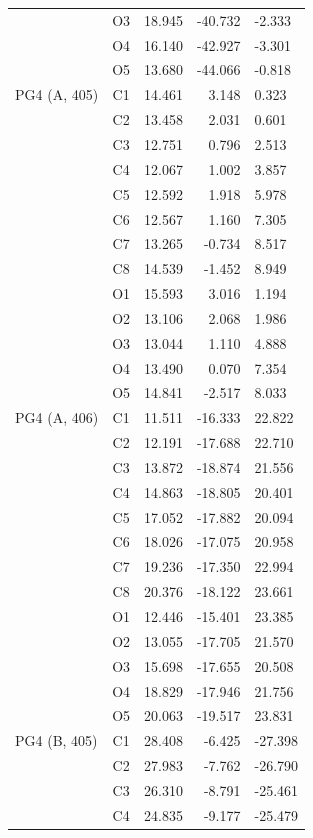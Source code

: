 \begin{longtable}{@{}lcrr@{}}
   & O3 & 18.945 & -40.732 & -2.333 \\
   & O4 & 16.140 & -42.927 & -3.301 \\
   & O5 & 13.680 & -44.066 & -0.818 \\
  \cmidrule(r){1-5}
  PG4 (A, 405) & C1 & 14.461 & 3.148 & 0.323 \\
   & C2 & 13.458 & 2.031 & 0.601 \\
   & C3 & 12.751 & 0.796 & 2.513 \\
   & C4 & 12.067 & 1.002 & 3.857 \\
   & C5 & 12.592 & 1.918 & 5.978 \\
   & C6 & 12.567 & 1.160 & 7.305 \\
   & C7 & 13.265 & -0.734 & 8.517 \\
   & C8 & 14.539 & -1.452 & 8.949 \\
   & O1 & 15.593 & 3.016 & 1.194 \\
   & O2 & 13.106 & 2.068 & 1.986 \\
   & O3 & 13.044 & 1.110 & 4.888 \\
   & O4 & 13.490 & 0.070 & 7.354 \\
   & O5 & 14.841 & -2.517 & 8.033 \\
  \cmidrule(r){1-5}
  PG4 (A, 406) & C1 & 11.511 & -16.333 & 22.822 \\
   & C2 & 12.191 & -17.688 & 22.710 \\
   & C3 & 13.872 & -18.874 & 21.556 \\
   & C4 & 14.863 & -18.805 & 20.401 \\
   & C5 & 17.052 & -17.882 & 20.094 \\
   & C6 & 18.026 & -17.075 & 20.958 \\
   & C7 & 19.236 & -17.350 & 22.994 \\
   & C8 & 20.376 & -18.122 & 23.661 \\
   & O1 & 12.446 & -15.401 & 23.385 \\
   & O2 & 13.055 & -17.705 & 21.570 \\
   & O3 & 15.698 & -17.655 & 20.508 \\
   & O4 & 18.829 & -17.946 & 21.756 \\
   & O5 & 20.063 & -19.517 & 23.831 \\
  \cmidrule(r){1-5}
  PG4 (B, 405) & C1 & 28.408 & -6.425 & -27.398 \\
   & C2 & 27.983 & -7.762 & -26.790 \\
   & C3 & 26.310 & -8.791 & -25.461 \\
   & C4 & 24.835 & -9.177 & -25.479 \\

\end{longtable}
